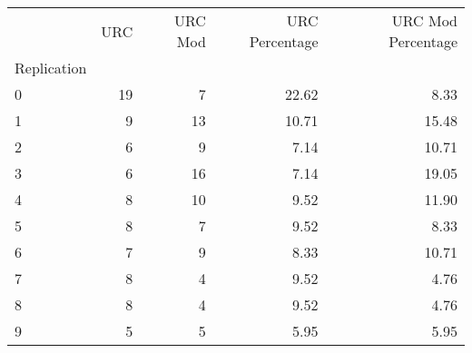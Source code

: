 \begin{tabular}{lrrrr}
\toprule
 & URC & URC Mod & URC Percentage & URC Mod Percentage \\
Replication &  &  &  &  \\
\midrule
0 & 19 & 7 & 22.62 & 8.33 \\
1 & 9 & 13 & 10.71 & 15.48 \\
2 & 6 & 9 & 7.14 & 10.71 \\
3 & 6 & 16 & 7.14 & 19.05 \\
4 & 8 & 10 & 9.52 & 11.90 \\
5 & 8 & 7 & 9.52 & 8.33 \\
6 & 7 & 9 & 8.33 & 10.71 \\
7 & 8 & 4 & 9.52 & 4.76 \\
8 & 8 & 4 & 9.52 & 4.76 \\
9 & 5 & 5 & 5.95 & 5.95 \\
\bottomrule
\end{tabular}

